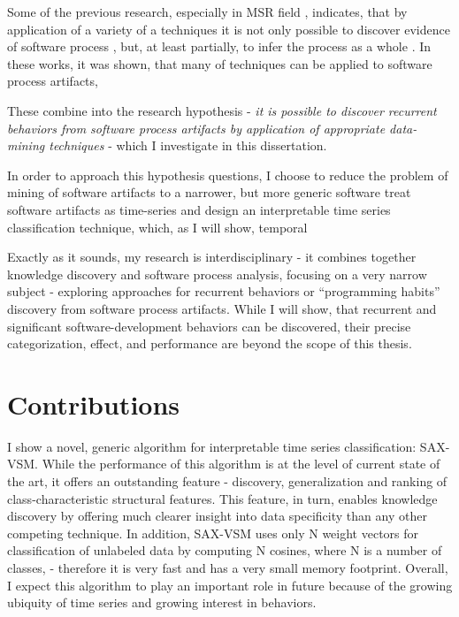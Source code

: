 {Some of the previous research, especially in MSR field  \cite{citeulike:9114115, citeulike:7853299}, 
indicates, that by application of a variety of a techniques it is not only possible to discover evidence of 
software process \cite{citeulike:9007622}, but, at least partially, to infer the process as a whole \cite{citeulike:5128808}. 
In these works, it was shown, that many of techniques can be applied to software process artifacts, 

These combine into the research hypothesis - \textit{it is possible to discover recurrent behaviors 
from software process artifacts by application of appropriate data-mining techniques} - 
which I investigate in this dissertation. 

In order to approach this hypothesis questions, I choose to reduce the problem of mining of software artifacts to a narrower,
but more generic software treat software artifacts as time-series and design an interpretable time 
series classification technique, which, 
as I will show, temporal 


Exactly as it sounds, my research is interdisciplinary - it combines together knowledge discovery and software process 
analysis, focusing on a very narrow subject - exploring approaches for recurrent behaviors or ``programming habits'' 
discovery from software process artifacts.
While I will show, that recurrent and significant software-development behaviors can be discovered,
their precise categorization, effect, and performance are beyond the scope of this thesis.

\section{Contributions}
I show a novel, generic algorithm for interpretable time series classification: SAX-VSM. 
While the performance of this algorithm is at the level of current state of the art, it offers an outstanding feature -
discovery, generalization and ranking of class-characteristic structural features. This feature, in turn, enables
knowledge discovery by offering much clearer insight into data specificity than any other competing technique.
In addition, SAX-VSM uses only N weight vectors for classification of unlabeled data by computing N cosines, where N is
a number of classes, - therefore it is very fast and has a very small memory footprint.
Overall, I expect this algorithm to play an important role in future because of the growing ubiquity of time series and
growing interest in behaviors.

}
